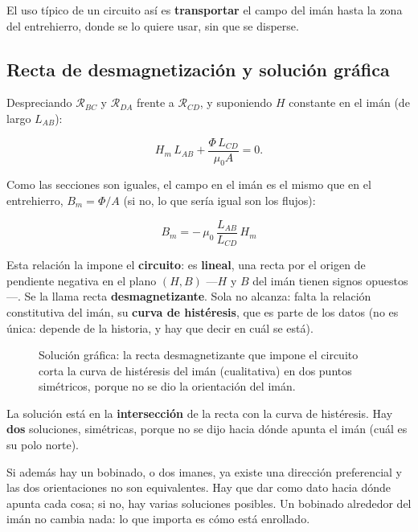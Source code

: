 \documentclass[12pt,a4paper]{article}
\begin{document}
El uso típico de un circuito así es \textbf{transportar} el campo del imán hasta la
zona del entrehierro, donde se lo quiere usar, sin que se disperse.

\subsection{Recta de desmagnetización y solución gráfica}

Despreciando $\mathcal{R}_{BC}$ y $\mathcal{R}_{DA}$ frente a $\mathcal{R}_{CD}$,
y suponiendo $H$ constante en el imán (de largo $L_{AB}$):

\[
H_m\,L_{AB} + \frac{\Phi\,L_{CD}}{\mu_0 A} = 0 .
\]

Como las secciones son iguales, el campo en el imán es el mismo que en el
entrehierro, $B_m = \Phi/A$ (si no, lo que sería igual son los flujos):

\begin{keybox}
\[
\boxed{\ B_m = -\,\mu_0\,\frac{L_{AB}}{L_{CD}}\,H_m\ }
\]
\end{keybox}

Esta relación la impone el \textbf{circuito}: es \textbf{lineal}, una recta por el origen
de pendiente negativa en el plano $(H, B)$ ---$H$ y $B$ del imán tienen signos
opuestos---. Se la llama recta \textbf{desmagnetizante}. Sola no alcanza: falta la
relación constitutiva del imán, su \textbf{curva de histéresis}, que es parte de
los datos (no es única: depende de la historia, y hay que decir en cuál se
está).

\begin{figure}[H]
  \centering
  
  \caption{Solución gráfica: la recta desmagnetizante que impone el circuito corta la curva de histéresis del imán (cualitativa) en dos puntos simétricos, porque no se dio la orientación del imán.}
\end{figure}

La solución está en la \textbf{intersección} de la recta con la curva de
histéresis. Hay \textbf{dos} soluciones, simétricas, porque no se dijo hacia dónde
apunta el imán (cuál es su polo norte).

\begin{notebox}
Si además hay un bobinado, o dos imanes, ya
existe una dirección preferencial y las dos orientaciones no son
equivalentes. Hay que dar como dato hacia dónde apunta cada cosa; si no, hay
varias soluciones posibles. Un bobinado alrededor del imán no cambia nada:
lo que importa es cómo está enrollado.
\end{notebox}
\end{document}
